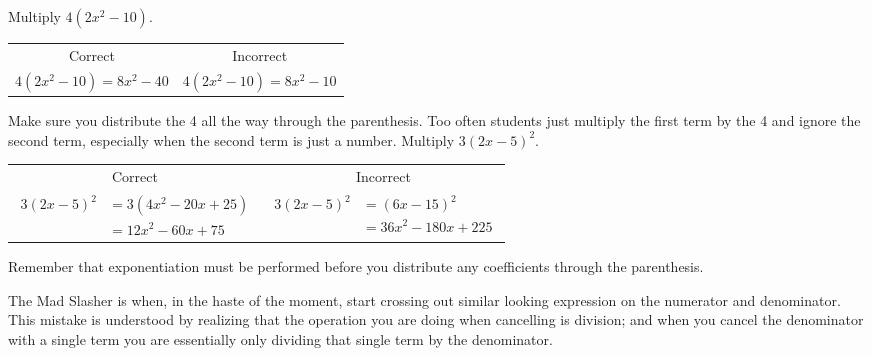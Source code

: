 \begin{example}
\Item Multiply $4(2x^2-10)$.
\begin{center}
\begin{tabular}{cc}
Correct & Incorrect\\
$4(2x^2-10)=8x^2-40$ & $4(2x^2-10)=8x^2-10$\\
\end{tabular}
\end{center}
Make sure you distribute the 4 all the way through the parenthesis. Too often
students just multiply the first term by the 4 and ignore the second term, especially when
the second term is just a number.
\Item Multiply $3(2x-5)^2$.
{\setlength{\abovedisplayskip}{0pt}
\begin{center}
\begin{tabular}[b]{cc}
Correct & Incorrect\\
\parbox[b][]{0.3\linewidth}{$
\begin{aligned}
3(2x-5)^2&=3(4x^2-20x+25)\\
 &=12x^2-60x+75
\end{aligned}
$} &
\parbox[b][]{0.3\linewidth}{
\begin{equation*}
\begin{aligned}
3(2x-5)^2&=(6x-15)^2\\
 &=36x^2-180x+225
\end{aligned}
\end{equation*}
}\\
\end{tabular}
\end{center}
}
Remember that exponentiation must be performed before you distribute any
coefficients through the parenthesis.
\end{example}
 The Mad Slasher is when, in the haste of the moment, start crossing out similar
looking expression on the numerator and denominator. This mistake is understood by
realizing that the operation you are doing when cancelling is division; and when you cancel
the denominator with a single term you are essentially only dividing that single term by the
denominator.

